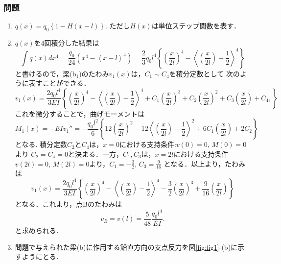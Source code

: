 \documentclass[10pt,a4j]{jarticle}
\begin{document}
\subsubsection*{問題}
\begin{enumerate}
\item
	$q(x)=q_0 \left\{ 1- H\left(x-l \right)\right\}$.
	ただし$H(x)$は単位ステップ関数を表す．
\item
$q(x)$を4回積分した結果は
\begin{equation}
	\int q(x) dx^4
	= 
	\frac{q_0}{24}
	\left( x^4-\left< x-l \right>^4 \right)
	=
	\frac{2}{3}q_0l^4 
	\left\{ 
		\left( \frac{x}{2l} \right )^4 
		- 
		\left< \left( \frac{x}{2l} \right)- \frac{1}{2} \right> ^4
	\right\}
\end{equation}
と書けるので，梁(b$_1$)のたわみ$v_1(x)$は，$C_1\sim C_4$を積分定数として
次のように表すことができる．
	\begin{equation}
	v_1(x)=\frac{2q_0l^4}{3EI}\left\{
		\left( \frac{x}{2l} \right )^4 
		- 
		\left< \left( \frac{x}{2l} \right)- \frac{1}{2} \right> ^4
		+
		C_1
		\left(\frac{x}{2l} \right)^3
		+
		C_2
		\left(\frac{x}{2l} \right)^2
		+
		C_3
		\left(\frac{x}{2l} \right)
		+
		C_4,
	\right\}
	\end{equation}
これを微分することで，曲げモーメントは
	\begin{equation}
		M_1(x)=-EIv_1''=-\frac{q_0l^2}{6}\left\{
			12\left( \frac{x}{2l} \right )^2
			- 
			12\left< \left( \frac{x}{2l} \right)- \frac{1}{2} \right> ^2
			+
			6C_1
			\left( \frac{x}{2l} \right)
			+
			2C_2
		\right\}
\end{equation}
となる. 積分定数$C_2$と$C_4$は，$x=0$における支持条件:$v(0)=0,\, M(0)=0$より
$C_2=C_4=0$と決まる．一方，$C_1,C_3$は，$x=2l$における支持条件
$v(2l)=0,\, M(2l)=0$より，$C_1=-\frac{3}{2},\, C_3=\frac{9}{16}$
となる．以上より，たわみは
	\begin{equation}
	v_1(x)=\frac{2q_0l^4}{3EI}\left\{
		\left( \frac{x}{2l} \right )^4 
		- 
		\left< \left( \frac{x}{2l} \right)- \frac{1}{2} \right> ^4
		-
		\frac{3}{2}
		\left(\frac{x}{2l} \right)^3
		+
		\frac{9}{16}
		\left(\frac{x}{2l} \right)
	\right\}
	\label{eqn:vx1}
	\end{equation}
となる．これより，点Bのたわみは
\begin{equation}
	v_B=v\left( l \right) 
	= \frac{5}{48}\frac{q_0l^4}{EI}.
	\label{eqn:vc_q}
\end{equation}
と求められる．
\item
問題で与えられた梁(b)に作用する鉛直方向の支点反力を図\ref{fig:fig1}-(b)に示すようにとる．

\end{enumerate}
\end{document}
